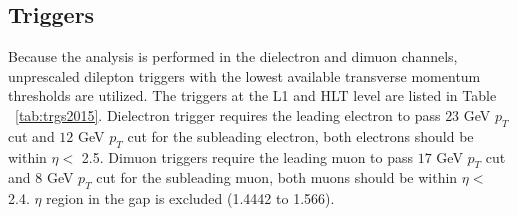 \subsection{Triggers\label{sec:triggers}}

Because the analysis is performed in the dielectron and dimuon channels, unprescaled dilepton
triggers with the lowest available transverse momentum thresholds are utilized. The triggers at the L1 and
HLT level are listed in Table ~\ref{tab:trgs2015}. Dielectron trigger requires the leading electron to pass $23$ GeV $p_{T}$ cut and $12$ GeV $p_{T}$ cut for the subleading electron, both electrons should be within $\eta < $ 2.5. Dimuon triggers require the leading muon to pass $17$ GeV $p_{T}$ cut and $8$ GeV $p_{T}$ cut for the subleading muon, both muons should be within $\eta < $  2.4. $\eta$ region in the gap is excluded (1.4442 to 1.566).



